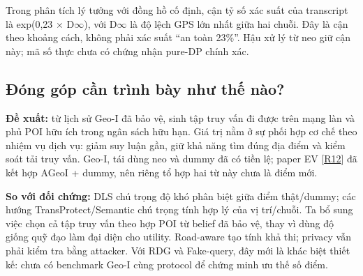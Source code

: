 Trong phân tích lý tưởng với đồng hồ cố định, cận tỷ số xác suất của transcript là exp(0,23 $\times$ D$\infty$), với D$\infty$ là độ lệch GPS lớn nhất giữa hai chuỗi. Đây là cận theo khoảng cách, không phải xác suất “an toàn 23\%”. Hậu xử lý từ neo giữ cận này; mã số thực chưa có chứng nhận pure-DP chính xác.

\subsection{Đóng góp cần trình bày như thế nào?}
\textbf{Đề xuất:} từ lịch sử Geo-I đã bảo vệ, sinh tập truy vấn đi được trên mạng làn và phủ POI hữu ích trong ngân sách hữu hạn. Giá trị nằm ở sự phối hợp cơ chế theo nhiệm vụ dịch vụ: giảm suy luận gần, giữ khả năng tìm đúng địa điểm và kiểm soát tải truy vấn. Geo-I, tái dùng neo và dummy đã có tiền lệ; paper EV [\href{https://wrap.warwick.ac.uk/id/eprint/183198/1/WRAP-privacy-preserving-querying-mechanism-high-utility-electric-vehicles-2024.pdf}{R12}] đã kết hợp AGeoI + dummy, nên riêng tổ hợp hai từ này chưa là điểm mới.

\textbf{So với đối chứng:} DLS chú trọng độ khó phân biệt giữa điểm thật/dummy; các hướng TransProtect/Semantic chú trọng tính hợp lý của vị trí/chuỗi. Ta bổ sung việc chọn cả tập truy vấn theo hợp POI từ belief đã bảo vệ, thay vì dùng độ giống quỹ đạo làm đại diện cho utility. Road-aware tạo tính khả thi; privacy vẫn phải kiểm tra bằng attacker. Với RDG và Fake-query, đây mới là khác biệt thiết kế: chưa có benchmark Geo-I cùng protocol để chứng minh ưu thế số điểm.


